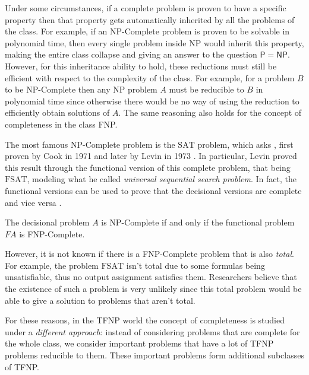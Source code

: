 Under some circumstances, if a complete problem is proven to have a specific property then that property gets automatically inherited by all the problems of the class. For example, if an \textsf{NP}-Complete problem is proven to be solvable in polynomial time, then every single problem inside \textsf{NP} would inherit this property, making the entire class collapse and giving an answer to the question $\mathsf{P} = \mathsf{NP}$. However, for this inheritance ability to hold, these reductions must still be efficient with respect to the complexity of the class. For example, for a problem $B$ to be \textsf{NP}-Complete then any \textsf{NP} problem $A$ must be reducible to $B$ in polynomial time since otherwise there would be no way of using the reduction to efficiently obtain solutions of $A$. The same reasoning also holds for the concept of completeness in the class \textsf{FNP}.

The most famous \textsf{NP}-Complete problem is the $\mathrm{SAT}$ problem, which asks , first proven by Cook in 1971 \cite{cook_sat} and later by Levin in 1973 \cite{levin_fsat}. In particular, Levin proved this result through the functional version of this complete problem, that being $\mathrm{FSAT}$, modeling what he called \textit{universal sequential search problem}. In fact, the functional versions can be used to prove that the decisional versions are complete and vice versa \cite{rel_comp_np_search}.

\begin{proposition}
 The decisional problem $A$ is \textsf{NP}-Complete if and only if the functional problem $FA$ is \textsf{FNP}-Complete.
\end{proposition}
    
However, it is not known if there is a \textsf{FNP}-Complete problem that is also \textit{total}. For example, the problem $\mathrm{FSAT}$ isn't total due to some formulas being unsatisfiable, thus no output assignment satisfies them. Researchers believe that the existence of such a problem is very unlikely since this total problem would be able to give a solution to problems that aren't total. 

For these reasons, in the \textsf{TFNP} world the concept of completeness is studied under a \textit{different approach}: instead of considering problems that are complete for the whole class, we consider important problems that have a lot of \textsf{TFNP} problems reducible to them. These important problems form additional subclasses of \textsf{TFNP}.  

